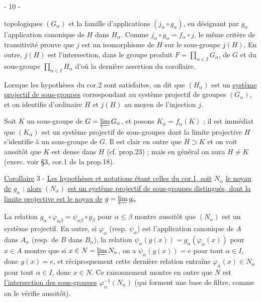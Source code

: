 \begin{center}- 10 -\end{center}

topologiques $(G_\alpha)$ et la famille d'applications $(j_\alpha\circ g_\alpha)$, en désignant par $g_\alpha$ l'application canonique de $H$ dans $H_\alpha$. Comme $j_\alpha\circ g_\alpha=f_\alpha\circ j$, le même critère de transitivité prouve que $j$ est un isomorphisme de $H$ sur le sous-groupe $j(H)$. En outre, $j(H)$ est l'intersection, dans le groupe produit $F=\prod_{\alpha\in I}G_\alpha$, de $G$ et du sous-groupe $\prod_{\alpha\in I}H_\alpha$ d'où la dernière assertion du corollaire.

Lorsque les hypothèses du cor.2 sont satisfaites, on dit que $(H_\alpha)$ est un \uline{système projectif de sous-groupes} correspondant au système projectif de groupes $(G_\alpha)$, et on identifie d'ordinaire $H$ et $j(H)$ au moyen de l'injection $j$.

Soit $K$ un sous-groupe de $G=\varprojlim G_\alpha$, et posons $K_\alpha=f_\alpha(K)$ ; il est immédiat que $(K_\alpha)$ est un système projectif de sous-groupes dont la limite projective $H$ s'identifie à un sous-groupe de $G$. Il est clair en outre que $H\supset K$ et on voit aussitôt que $K$ est dense dans $H$ (cf. prop.23) ; mais en général on aura $H\neq K$ (exerc. voir §3, cor.1 de la prop.18).

\uline{Corollaire} 3 - \uline{Les hypothèses et notations étant celles du cor.1, soit} $N_\alpha$ \uline{le noyau de} $g_\alpha$ ; \uline{alors} $(N_\alpha)$ \uline{est un système projectif de sous-groupes distingués, dont la limite projective est le noyau de} $g=\varprojlim g_\alpha$

La relation $g_\alpha\circ\varphi_{\alpha\beta}=\psi_{\alpha\beta}\circ g_\beta$ pour $\alpha\leq\beta$ montre aussitôt que $(N_\alpha)$ est un système projectif. En outre, si $\varphi_\alpha$ (resp. $\psi_\alpha$) est l'application canonique de $A$ dans $A_\alpha$ (resp. de $B$ dans $B_\alpha$), la relation $\psi_\alpha(g(x))=g_\alpha(\varphi_\alpha(x))$ pour $x\in A$ montre que si $x\in N=\varprojlim N_\alpha$, on a $\psi_\alpha(g(x))=e$ pour tout $\alpha\in I$, donc $g(x)=e$, et réciproquement cette dernière relation entraîne $\varphi_\alpha(x)\in N_\alpha$ pour tout $\alpha\in I$, donc $x\in N$. Ce raisonnement montre en outre que $N$ est \uline{l'intersection des sous-groupes} $\varphi_\alpha^{-1}(N_\alpha)$ (qui forment une base de filtre, comme on le vérifie aussitôt).

